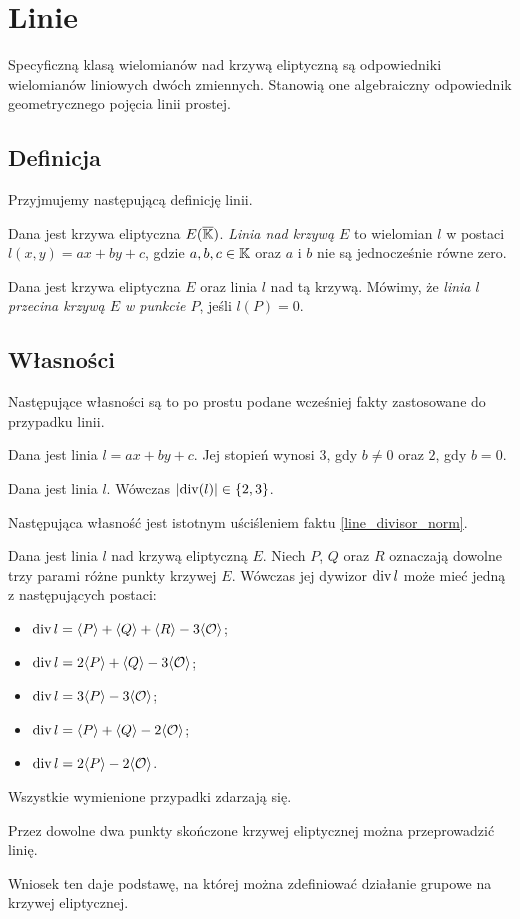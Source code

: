 \section{Linie}

Specyficzną klasą wielomianów nad krzywą eliptyczną
są odpowiedniki wielomianów liniowych dwóch zmiennych.
Stanowią one algebraiczny odpowiednik
geometrycznego pojęcia linii prostej.

\subsection*{Definicja}

Przyjmujemy następującą definicję linii.

\begin{definition}
Dana jest krzywa eliptyczna $E(\overline{\mathbb{K}})$.
\emph{Linia nad krzywą $E$}
to wielomian $l$ w postaci $l(x, y) = ax + by +c$,
gdzie $a, b, c \in \mathbb{K}$ oraz $a$ i $b$ nie są jednocześnie równe zero.
\end{definition}

\begin{definition}
Dana jest krzywa eliptyczna $E$ oraz linia $l$ nad tą krzywą.
Mówimy, że \emph{linia $l$ przecina krzywą $E$ w punkcie $P$},
jeśli $l(P) = 0$.
\end{definition}

\subsection*{Własności}

Następujące własności są to po prostu podane wcześniej fakty
zastosowane do przypadku linii.

\begin{fact}
Dana jest linia $l = ax + by + c$.
Jej stopień wynosi $3$, gdy $b \neq 0$
oraz $2$, gdy $b = 0$.
\end{fact}

\begin{fact}\label{line_divisor_norm}
Dana jest linia $l$.
Wówczas $\lvert\operatorname{div}(l)\rvert \in \{2,3\}$.
\end{fact}

Następująca własność jest istotnym uściśleniem faktu \ref{line_divisor_norm}.

\begin{theorem}
Dana jest linia $l$ nad krzywą eliptyczną $E$.
Niech $P$, $Q$ oraz $R$ oznaczają dowolne trzy parami różne punkty krzywej $E$.
Wówczas jej dywizor $\operatorname{div}{l}$ może mieć jedną z następujących postaci:
\begin{itemize}
\item $\operatorname{div}{l} = \langle P\rangle + \langle Q\rangle + \langle R\rangle - 3\langle\mathcal{O}\rangle$;
\item $\operatorname{div}{l} = 2\langle P\rangle + \langle Q\rangle - 3\langle\mathcal{O}\rangle$;
\item $\operatorname{div}{l} = 3\langle P\rangle - 3\langle\mathcal{O}\rangle$;
\item $\operatorname{div}{l} = \langle P\rangle + \langle Q\rangle - 2\langle\mathcal{O}\rangle$;
\item $\operatorname{div}{l} = 2\langle P\rangle - 2\langle\mathcal{O}\rangle$.
\end{itemize}
Wszystkie wymienione przypadki zdarzają się.
\end{theorem}

\begin{corollary}
Przez dowolne dwa punkty skończone krzywej eliptycznej
można przeprowadzić linię.
\end{corollary}

Wniosek ten daje podstawę, na której można zdefiniować
działanie grupowe na krzywej eliptycznej.
